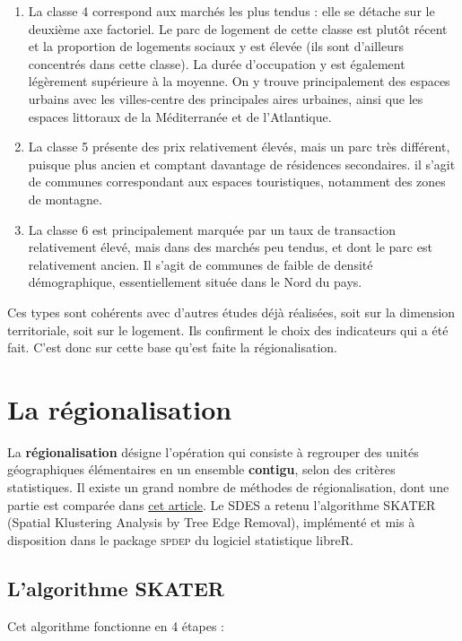 \documentclass[12pt, a4paper]{article}
\begin{document}
\begin{enumerate}
\item La classe 4 correspond aux marchés les plus tendus : elle se détache sur le deuxième axe factoriel. Le parc de logement de cette classe est plutôt récent et la proportion de logements sociaux y est élevée (ils sont d'ailleurs concentrés dans cette classe). La durée d'occupation y est également légèrement supérieure à la moyenne. On y trouve principalement des espaces urbains avec les villes-centre des principales aires urbaines, ainsi que les espaces littoraux de la Méditerranée et de l'Atlantique.
\item La classe 5 présente des prix relativement élevés, mais un parc très différent, puisque plus ancien et comptant davantage de résidences secondaires. il s'agit de communes correspondant aux espaces touristiques, notamment des zones de montagne.
\item La classe 6 est principalement marquée par un taux de transaction relativement élevé, mais dans des marchés peu tendus, et dont le parc est relativement ancien. Il s'agit de communes de faible de densité démographique, essentiellement située dans le Nord du pays.
\end{enumerate}


Ces types sont cohérents avec d'autres études déjà réalisées, soit sur la dimension territoriale, soit sur  le logement. Ils confirment le choix des indicateurs qui a été fait. C'est donc sur cette base qu'est faite la régionalisation.


\section{La régionalisation}

La \textbf{régionalisation} désigne l'opération qui consiste à regrouper des unités géographiques élémentaires en un ensemble \textbf{contigu}, selon des critères statistiques. Il existe un grand nombre de méthodes de régionalisation, dont une partie est comparée dans \href{http://journals.sagepub.com/doi/pdf/10.1177/0160017607301605}{cet article}. Le SDES a retenu l'algorithme SKATER (Spatial Klustering Analysis by Tree Edge Removal), implémenté et mis à disposition dans le package \textsc{spdep} du logiciel statistique libre\textsc{R}.

\subsection{L'algorithme SKATER}

Cet algorithme fonctionne en 4 étapes :
\end{document}
